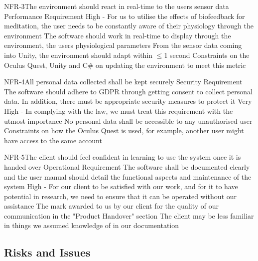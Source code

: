 \documentclass[coverpage,lineno]{../custom}
\begin{document}
\NonFunctionalReqSec
{NFR-3}{The environment should react in real-time to the users sensor data}
{Performance Requirement}
{High - For us to utilise the effects of biofeedback for meditation, the user needs to be constantly aware of their physiology through the environment}
{The software should work in real-time to display through the environment, the users physiological parameters}
{From the sensor data coming into Unity, the environment should adapt within $\le$1 second}
{Constraints on the Oculus Quest, Unity and C\# on updating the environment to meet this metric}

\NonFunctionalReqSec
{NFR-4}{All personal data collected shall be kept securely}
{Security Requirement}
{The software should adhere to GDPR through getting consent to collect personal data. In addition, there must be appropriate security measures to protect it}
{Very High - In complying with the law, we must treat this requirement with the utmost importance}
{No personal data shall be accessible to any unauthorised user}
{Constraints on how the Oculus Quest is used, for example, another user might have access to the same account}



\NonFunctionalReqSec
{NFR-5}{The client should feel confident in learning to use the system once it is handed over}
{Operational Requirement}
{The software shall be documented clearly and the user manual should detail the functional aspects and maintenance of the system}
{High - For our client to be satisfied with our work, and for it to have potential in research, we need to ensure that it can be operated without our assistance}
{The mark awarded to us by our client for the quality of our communication in the "Product Handover" section}
{The client may be less familiar in things we assumed knowledge of in our documentation}

\subsection{Risks and Issues}
\label{ssec:risks}
\end{document}
